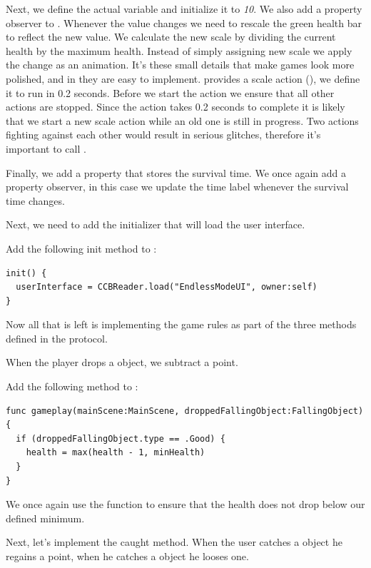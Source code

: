 Next, we define the actual  variable and initialize it to
\textit{10}. We also add a property observer to . Whenever the value changes we need to
rescale the green health bar to reflect the new value. We calculate the new
scale by dividing the current health by the maximum health. Instead of simply
assigning new scale we apply the change as an animation. It's these small
details that make games look more polished, and in \cocos{} they are easy to
implement. \cocos{} provides a scale action (), we
define it to run in 0.2 seconds. Before we start the action we ensure that all
other actions are stopped. Since the action takes 0.2 seconds to complete it is
likely that we start a new scale action while an old one is still in progress.
Two actions fighting against each other would result in serious glitches,
therefore it's important to call .

Finally, we add a property that stores the survival time. We once again add a
property observer, in this case we update the time label whenever the survival
time changes.

Next, we need to add the initializer that will load the user interface.

\begin{leftbar}
Add the following init method to :
\begin{lstlisting}
init() {
  userInterface = CCBReader.load("EndlessModeUI", owner:self)
}
\end{lstlisting}
\end{leftbar}

Now all that is left is implementing the game rules as part of the three methods
defined in the  protocol. 

When the player drops a  object, we subtract a point.
\begin{leftbar}
Add the following method to :
\begin{lstlisting}
func gameplay(mainScene:MainScene, droppedFallingObject:FallingObject) {
  if (droppedFallingObject.type == .Good) {
    health = max(health - 1, minHealth)
  }
}
\end{lstlisting}
\end{leftbar}
We once again use the  function to ensure that the health does
not drop below our defined minimum.

Next, let's implement the caught method. When the user catches a
 object he regains a point, when he catches a
 object he looses one.

